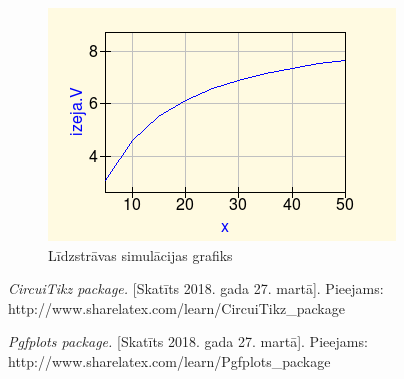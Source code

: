 \documentclass{report}
\begin{document}
\begin{figure}[h]
\centering
 \includegraphics[width=\textwidth, height=\textheight, keepaspectratio]{Graf.png}
    \caption{Līdzstrāvas simulācijas grafiks}
    \label{fig:2.5}
\end{figure}
\label{s_nobeigums}

\begin{thebibliography}{9}
\textit{CircuiTikz package.} [Skatīts 2018. gada 27. martā].
Pieejams: http://www.sharelatex.com/learn/CircuiTikz\_{}package

\textit{Pgfplots package.} [Skatīts 2018. gada 27. martā].
Pieejams: http://www.sharelatex.com/learn/Pgfplots\_{}package
 
\end{thebibliography}
\end{document}
